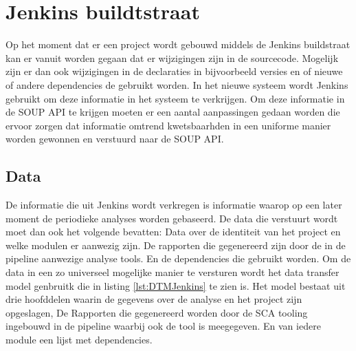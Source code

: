 \section{Jenkins buildtstraat}\label{sec:jenkins-buildtstraat}
Op het moment dat er een project wordt gebouwd middels de Jenkins buildstraat kan er vanuit worden gegaan dat er wijzigingen zijn in de sourcecode. Mogelijk zijn er dan ook wijzigingen in de declaraties in bijvoorbeeld versies en of nieuwe of andere dependencies de gebruikt worden. In het nieuwe systeem wordt Jenkins gebruikt om deze informatie in het systeem te verkrijgen. Om deze informatie in de SOUP API te krijgen moeten er een aantal aanpassingen gedaan worden die ervoor zorgen dat informatie omtrend kwetsbaarhden in een uniforme manier worden gewonnen en verstuurd naar de SOUP API.

\subsection{Data}\label{subsec:jenkins_Datamodel}
De informatie die uit Jenkins wordt verkregen is informatie waarop op een later moment de periodieke analyses worden gebaseerd. De data die verstuurt wordt moet dan ook het volgende bevatten: Data over de identiteit van het project en welke modulen er aanwezig zijn. De rapporten die gegenereerd zijn door de in de pipeline aanwezige analyse tools. En de dependencies die gebruikt worden. Om de data in een zo universeel mogelijke manier te versturen wordt het data transfer model genbruitk die in listing \ref{lst:DTMJenkins} te zien is. Het model bestaat uit drie hoofddelen waarin de gegevens over de analyse en het project zijn opgeslagen, De Rapporten die gegenereerd worden door de SCA tooling ingebouwd in de pipeline waarbij ook de tool is meegegeven. En van iedere module een lijst met dependencies.
